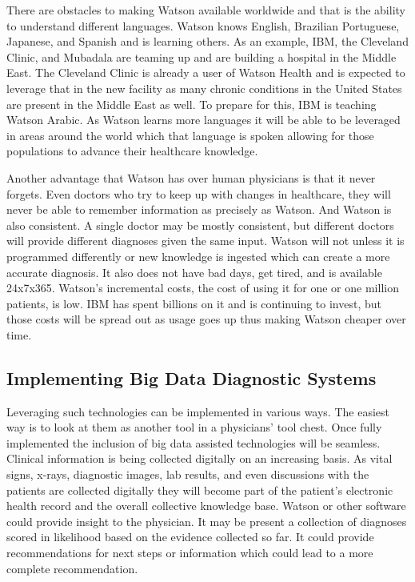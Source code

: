 \documentclass[sigconf]{acmart}
\begin{document}
There are obstacles to making Watson available worldwide and that is the 
ability to understand different languages.  Watson knows English, Brazilian 
Portuguese, Japanese, and Spanish and is learning others.  As an example, 
IBM, the Cleveland Clinic, and Mubadala are teaming up and are building a 
hospital in the Middle East.  The Cleveland Clinic is already a user of 
Watson Health and is expected to leverage that in the new facility as many 
chronic conditions in the United States are present in the Middle East as 
well.  To prepare for this, IBM is teaching Watson 
Arabic\cite{FortuneArabic}.  As Watson learns more languages it will be able 
to be leveraged in areas around the world which that language is spoken 
allowing for those populations to advance their healthcare knowledge.

Another advantage that Watson has over human physicians is that it never 
forgets.  Even doctors who try to keep up with changes in healthcare, they 
will never be able to remember information as precisely as Watson.  And 
Watson is also consistent.  A single doctor may be mostly consistent, but 
different doctors will provide different diagnoses given the same input.  
Watson will not unless it is programmed differently or new knowledge is 
ingested which can create a more accurate diagnosis.  It also does not 
have bad days, get tired, and is available 24x7x365.  Watson's incremental 
costs, the cost of using it for one or one million patients, is low.  IBM 
has spent billions on it and is continuing to invest, but those costs will 
be spread out as usage goes up thus making Watson cheaper over 
time\cite{BusInsider}.

\subsection{Implementing Big Data Diagnostic Systems}
Leveraging such technologies can be implemented in various ways.  The 
easiest way is to look at them as another tool in a physicians' tool chest.  
Once fully implemented the inclusion of big data assisted technologies will 
be seamless.  Clinical information is being collected digitally on an 
increasing basis.  As vital signs, x-rays, diagnostic images, lab results, 
and even discussions with the patients are collected digitally they will 
become part of the patient's electronic health record and the overall 
collective knowledge base.  Watson or other software could provide insight 
to the physician.  It may be present a collection of diagnoses scored in 
likelihood based on the evidence collected so far\cite{ForbesTrust}.  It 
could provide recommendations for next steps or information which could 
lead to a more complete recommendation.
\end{document}
